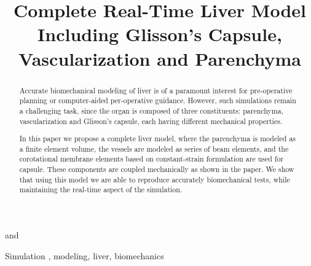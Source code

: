 \documentclass{IOS-Book-Article}
\begin{document}
\begin{frontmatter}              %

\title{Complete Real-Time Liver Model Including Glisson's Capsule,\\
 Vascularization and Parenchyma}

\author[A]{ }%
\author[B]{ }
\author[C]{ }
and
\author[C]{ }

\address[A]{Institut Hospitalo-Universitaire, Strasbourg, France}
\address[B]{Masaryk University, Czech Republic}
\address[C]{SHACRA Team, Inria, France}

\begin{abstract}
Accurate biomechanical modeling of liver is of a paramount interest for pre-operative planning or computer-aided per-operative guidance.
However, such simulations remain a challenging task, since the organ is composed of three constituents: parenchyma, vascularization and Glisson's capsule,
each having different mechanical properties.

In this paper we propose a complete liver model, where the parenchyma is modeled as a finite element volume, the vessels are modeled as series of beam elements,
and the corotational membrane elements based on constant-strain formulation are used for capsule. These components are coupled mechanically as shown in the paper.
We show that using this model we are able to reproduce accurately biomechanical tests, while maintaining the real-time aspect of the simulation.
\end{abstract}

\begin{keyword}
Simulation , modeling, liver, biomechanics
\end{keyword}
\end{frontmatter}

\thispagestyle{empty}
\pagestyle{empty}

%
%
%
%
%
%
%

%

%

%
%
%
%
%
\end{document}
